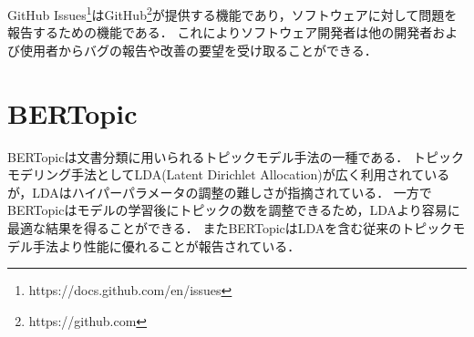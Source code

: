 \documentclass[main]{subfiles}
\begin{document}
GitHub Issues\footnote{https://docs.github.com/en/issues}はGitHub\footnote{https://github.com}が提供する機能であり，ソフトウェアに対して問題を報告するための機能である．
これによりソフトウェア開発者は他の開発者および使用者からバグの報告や改善の要望を受け取ることができる．

\section{BERTopic}

BERTopicは文書分類に用いられるトピックモデル手法の一種である．
トピックモデリング手法としてLDA(Latent Dirichlet Allocation)が広く利用されているが，LDAはハイパーパラメータの調整の難しさが指摘されている\cite{annibale:2021}．
一方でBERTopicはモデルの学習後にトピックの数を調整できるため，LDAより容易に最適な結果を得ることができる．
またBERTopicはLDAを含む従来のトピックモデル手法より性能に優れることが報告されている\cite{egger:2022}．
\end{document}
